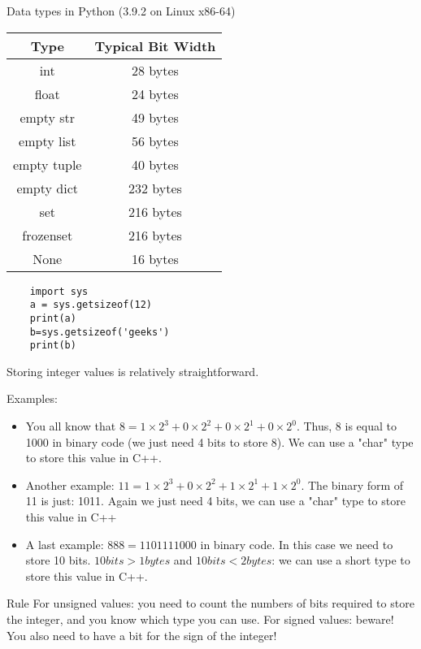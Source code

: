 \documentclass[handout]{beamer}[10pt, usepdftitle=false]
\begin{document}
	\begin{frame}[fragile]
	
	Data types in Python (3.9.2 on Linux x86-64)
	
	\begin{center}
	\begin{tabular}{c | c }
	Type & Typical Bit Width \\ \hline \hline
	int & 28 bytes \\ \hline
	float & 24 bytes \\ \hline
	empty str & 49 bytes \\ \hline
	empty list & 56 bytes \\ \hline
	empty tuple & 40 bytes \\ \hline
	empty dict & 232 bytes \\ \hline
	set & 216 bytes \\ \hline
	frozenset & 216 bytes \\ \hline
	None & 16 bytes \\ \hline
	\end{tabular}
	\end{center}

	\begin{verbatim}
	import sys 
	a = sys.getsizeof(12) 
	print(a)
	b=sys.getsizeof('geeks') 
	print(b)
	\end{verbatim}

	
	\end{frame}
	
	\begin{frame}
	
	Storing integer values is relatively straightforward.
	\vspace*{0.6em}	
	
	Examples:
	\begin{itemize}
	\item{You all know that $8 = 1 \times 2^3 + 0 \times 2^2 + 0 \times 2^1 + 0 \times 2^0$.
	Thus, 8 is equal to 1000 in binary code (we just need 4 bits to store 8).
	We can use a "char" type to store this value in C++.}	
	\item{Another example: $11 = 1 \times 2^3 + 0 \times 2^2 + 1 \times 2^1 + 1 \times 2^0$.
	The binary form of 11 is just: 1011.
	Again we just need 4 bits, we can use a "char" type to store this value in C++}
	\item{A last example: $888 = 1101111000$ in binary code. In this case we need to store 10 bits. $10 bits > 1bytes$ and $10 bits < 2 bytes$: we can use a short type to store this value in C++.}
	\end{itemize}	

	\begin{block}{Rule}
For unsigned values: you need to count the numbers of bits required to store the integer, and you know which type you can use. For signed values: beware! You also need to have a bit for the sign of the integer! 	
	\end{block}
	
	
	\end{frame}
		  
\end{document}
